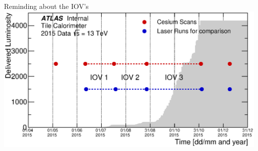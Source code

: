 \documentclass{beamer}
\begin{document}
\begin{frame}{Reminding about the IOV's}
 \centering
 \includegraphics[width=\textwidth]{CsLas_IOVs_2015.eps}
 	\end{frame}
\end{document}
